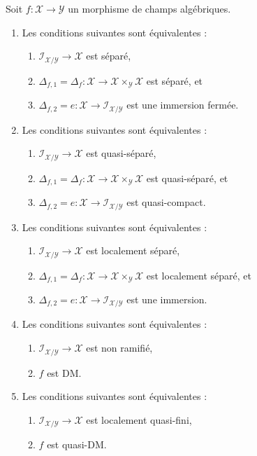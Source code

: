 \begin{lemma}
\label{lemma-diagonal-diagonal}
Soit $f : \mathcal{X} \to \mathcal{Y}$ un morphisme de champs algébriques.
\begin{enumerate}
\item
Les conditions suivantes sont équivalentes :
\begin{enumerate}
\item $\mathcal{I}_{\mathcal{X}/\mathcal{Y}} \to \mathcal{X}$
est séparé,
\item $\Delta_{f, 1} = \Delta_f :
\mathcal{X} \to \mathcal{X} \times_\mathcal{Y} \mathcal{X}$
est séparé, et
\item $\Delta_{f, 2} = e :
\mathcal{X} \to \mathcal{I}_{\mathcal{X}/\mathcal{Y}}$
est une immersion fermée.
\end{enumerate}
\item
Les conditions suivantes sont équivalentes :
\begin{enumerate}
\item $\mathcal{I}_{\mathcal{X}/\mathcal{Y}} \to \mathcal{X}$
est quasi-séparé,
\item $\Delta_{f, 1} = \Delta_f :
\mathcal{X} \to \mathcal{X} \times_\mathcal{Y} \mathcal{X}$
est quasi-séparé, et
\item $\Delta_{f, 2} = e :
\mathcal{X} \to \mathcal{I}_{\mathcal{X}/\mathcal{Y}}$
est quasi-compact.
\end{enumerate}
\item
Les conditions suivantes sont équivalentes :
\begin{enumerate}
\item $\mathcal{I}_{\mathcal{X}/\mathcal{Y}} \to \mathcal{X}$
est localement séparé,
\item $\Delta_{f, 1} = \Delta_f :
\mathcal{X} \to \mathcal{X} \times_\mathcal{Y} \mathcal{X}$
est localement séparé, et
\item $\Delta_{f, 2} = e :
\mathcal{X} \to \mathcal{I}_{\mathcal{X}/\mathcal{Y}}$
est une immersion.
\end{enumerate}
\item
Les conditions suivantes sont équivalentes :
\begin{enumerate}
\item $\mathcal{I}_{\mathcal{X}/\mathcal{Y}} \to \mathcal{X}$
est non ramifié,
\item $f$ est DM.
\end{enumerate}
\item
Les conditions suivantes sont équivalentes :
\begin{enumerate}
\item $\mathcal{I}_{\mathcal{X}/\mathcal{Y}} \to \mathcal{X}$
est localement quasi-fini,
\item $f$ est quasi-DM.
\end{enumerate}
\end{enumerate}
\end{lemma}

